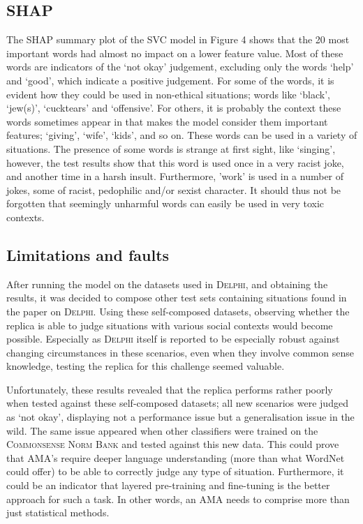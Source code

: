 \documentclass[final]{clv3} %
\begin{document}
\subsection{SHAP}
The SHAP summary plot of the SVC model in Figure 4 shows that the 20 most important words had almost no impact on a lower feature value. Most of these words are indicators of the ‘not okay’ judgement, excluding only the words ‘help’ and ‘good’, which indicate a positive judgement. For some of the words, it is evident how they could be used in non-ethical situations; words like ‘black’, ‘jew(s)’, ‘cucktears’ and ‘offensive’. For others, it is probably the context these words sometimes appear in that makes the model consider them important features; ‘giving’, ‘wife’, ‘kids’, and so on. These words can be used in a variety of situations. The presence of some words is strange at first sight, like ‘singing’, however, the test results show that this word is used once in a very racist joke, and another time in a harsh insult. Furthermore, ’work’ is used in a number of jokes, some of racist, pedophilic and/or sexist character. It should thus not be forgotten that seemingly unharmful words can easily be used in very toxic contexts.\\

\subsection{Limitations and faults}

After running the model on the datasets used in \textsc{Delphi}, and obtaining the results, it was decided to compose other test sets containing situations found in the paper on \textsc{Delphi}. Using these self-composed datasets, observing whether the replica is able to judge situations with various social contexts would become possible. Especially as \textsc{Delphi} itself is reported to be especially robust against changing circumstances in these scenarios, even when they involve common sense knowledge, testing the replica for this challenge seemed valuable.

Unfortunately, these results revealed that the replica performs rather poorly when tested against these self-composed datasets; all new scenarios were judged as ‘not okay’, displaying not a performance issue but a generalisation issue in the wild. The same issue appeared when other classifiers were trained on the \textsc{Commonsense Norm Bank} and tested against this new data. This could prove that AMA’s require deeper language understanding (more than what WordNet could offer) to be able to correctly judge any type of situation. Furthermore, it could be an indicator that layered pre-training and fine-tuning is the better approach for such a task.  In other words, an AMA needs to comprise more than just statistical methods. 
\end{document}
